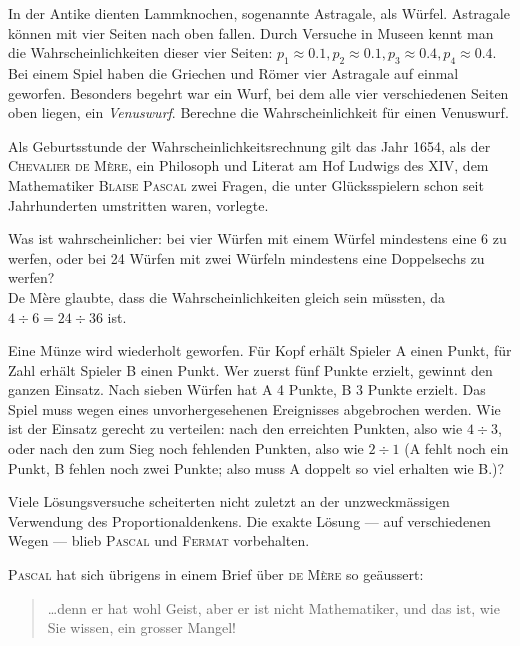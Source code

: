 \documentclass[%
11pt,%
twoside,%
titlepage,%
german,%
headsepline%
]{scrartcl}
\begin{document}
\begin{ueb}
 In der Antike dienten Lammknochen, sogenannte Astragale, als Würfel. Astragale können mit vier Seiten nach oben fallen. Durch Versuche in Museen kennt man die Wahrscheinlichkeiten dieser vier Seiten: $p_1\approx0.1, p_2\approx0.1, p_3\approx0.4, p_4\approx0.4$. Bei einem Spiel haben die Griechen und Römer vier Astragale auf einmal geworfen. Besonders begehrt war ein Wurf, bei dem alle vier verschiedenen Seiten oben liegen, ein \emph{Venuswurf}. Berechne die Wahrscheinlichkeit für einen Venuswurf.
 \end{ueb}
 
 \begin{ueb}
Als Geburtsstunde der Wahrscheinlichkeitsrechnung gilt das Jahr 1654, als der \textsc{Chevalier de Mère}, ein Philosoph und Literat am Hof Ludwigs des XIV, dem Mathematiker \textsc{Blaise Pascal} zwei Fragen, die unter Glücksspielern schon seit Jahrhunderten umstritten waren, vorlegte.
\begin{enumeratea}
\item Was ist wahrscheinlicher: bei vier Würfen mit einem Würfel mindestens eine 6 zu werfen, oder bei 24 Würfen mit zwei Würfeln mindestens eine Doppelsechs zu werfen?\\
De Mère glaubte, dass die Wahrscheinlichkeiten gleich sein müssten, da $4\div6 = 24\div36$ ist.
\item Eine Münze wird wiederholt geworfen. Für Kopf erhält Spieler A einen Punkt, für Zahl erhält Spieler B einen Punkt. Wer zuerst fünf Punkte erzielt, gewinnt den ganzen Einsatz. Nach sieben Würfen hat A 4 Punkte, B 3 Punkte erzielt. Das Spiel muss wegen eines unvorhergesehenen Ereignisses abgebrochen werden. Wie ist der Einsatz gerecht zu verteilen: nach den erreichten Punkten, also wie $4\div3$, oder nach den zum Sieg noch fehlenden Punkten, also wie $2\div1$ (A fehlt noch ein Punkt, B fehlen noch zwei Punkte; also muss A doppelt so viel erhalten wie B.)?
\end{enumeratea}
\end{ueb}

Viele Lösungsversuche scheiterten nicht zuletzt an der unzweckmässigen Verwendung des Proportionaldenkens. Die exakte Lösung --- auf verschiedenen Wegen --- blieb \textsc{Pascal} und \textsc{Fermat} vorbehalten.

\textsc{Pascal} hat sich übrigens in einem Brief über \textsc{de Mère} so geäussert:
\begin{quote}
\dots denn er hat wohl Geist, aber er ist nicht Mathematiker, und das ist, wie Sie wissen, ein grosser Mangel!
\end{quote}
\end{document}

